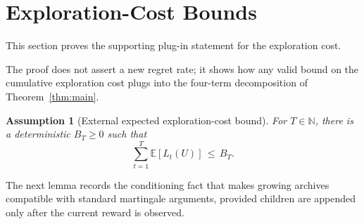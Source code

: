 \documentclass{article} %
\newtheorem{assumption}{Assumption}
\begin{document}
\section{Exploration-Cost Bounds}

\label{app:proofs2}

This section proves the supporting plug-in statement for the exploration
cost.

The proof does not assert a new regret rate; it shows how any valid bound on the cumulative exploration cost plugs into the four-term decomposition of Theorem~\ref{thm:main}.

\begin{assumption}[External expected exploration-cost bound]
\label{ass:app-external-tax}
For \(T\in\mathbb N\), there is a deterministic \(B_T\geq0\) such that
\begin{equation}
\label{eq:app-external-tax-assumption}
\sum_{t=1}^{T}\mathbb{E}[L_t(U)]
\,\leq\,
B_T.
\end{equation}
\end{assumption}

The next lemma records the conditioning fact that makes growing archives compatible with standard martingale arguments, provided children are appended only after the current reward is observed.
\end{document}
